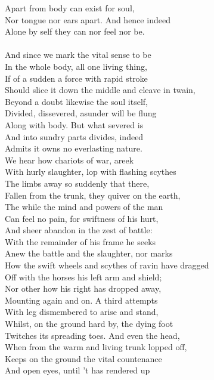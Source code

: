 Apart from body can exist for soul,\\
Nor tongue nor ears apart. And hence indeed\\
Alone by self they can nor feel nor be.\\
\\
And since we mark the vital sense to be\\
In the whole body, all one living thing,\\
If of a sudden a force with rapid stroke\\
Should slice it down the middle and cleave in twain,\\
Beyond a doubt likewise the soul itself,\\
Divided, dissevered, asunder will be flung\\
Along with body. But what severed is\\
And into sundry parts divides, indeed\\
Admits it owns no everlasting nature.\\
We hear how chariots of war, areek\\
With hurly slaughter, lop with flashing scythes\\
The limbs away so suddenly that there,\\
Fallen from the trunk, they quiver on the earth,\\
The while the mind and powers of the man\\
Can feel no pain, for swiftness of his hurt,\\
And sheer abandon in the zest of battle:\\
With the remainder of his frame he seeks\\
Anew the battle and the slaughter, nor marks\\
How the swift wheels and scythes of ravin have dragged\\
Off with the horses his left arm and shield;\\
Nor other how his right has dropped away,\\
Mounting again and on. A third attempts\\
With leg dismembered to arise and stand,\\
Whilst, on the ground hard by, the dying foot\\
Twitches its spreading toes. And even the head,\\
When from the warm and living trunk lopped off,\\
Keeps on the ground the vital countenance\\
And open eyes, until 't has rendered up\\
